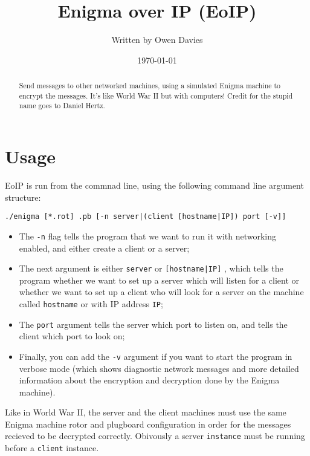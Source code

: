 \documentclass[11pt, notitlepage]{report}
\begin{document}
\setlength{\parindent}{0in}

\title{Enigma over IP (EoIP)}
\author{Written by Owen Davies}
\date{\today}

\maketitle
\renewcommand{\abstractname}{TL;DR}
\begin{abstract}
\noindent Send messages to other networked machines, using a simulated Enigma 
machine to encrypt the messages. It's like World War II but with computers! 
Credit for the stupid name goes to Daniel Hertz.
\end{abstract}
	
\section*{Usage}
EoIP is run from the commnad line, using the following command line argument
structure:
\begin{center}
\texttt{./enigma [*.rot] .pb [-n server|(client [hostname|IP]) port
 [-v]]}
\end{center}

\begin{itemize}
\item The \texttt{-n} flag tells the program that we want to run it with 
networking enabled, and either create a client or a server;
\item The next argument is either \texttt{server} or \texttt{[hostname|IP]}
, which tells the program whether we want to set up a server which will listen 
for a client or whether we want to set up a client who will look for a server on
 the machine called \texttt{hostname} or with IP address \texttt{IP};
\item The \texttt{port} argument tells the server which port to listen on, and 
tells the client which port to look on;
\item Finally, you can add the \texttt{-v} argument if you want to start the 
program in verbose mode (which shows diagnostic network messages and more 
detailed information about the encryption and decryption done by the Enigma 
machine).
\end{itemize}

Like in World War II, the server and the client machines must use the same 
Enigma machine rotor and plugboard configuration in order for the messages 
recieved to be decrypted correctly. Obivously a server \texttt{instance} must be
 running before a \texttt{client} instance.
\end{document}

